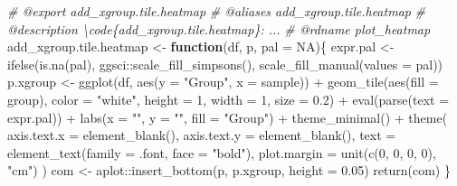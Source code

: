 \documentclass[
]{article}
\newenvironment{Shaded}{\begin{snugshade}}{\end{snugshade}}
\newcommand{\AttributeTok}[1]{\textcolor[rgb]{0.77,0.63,0.00}{#1}}
\newcommand{\CommentTok}[1]{\textcolor[rgb]{0.56,0.35,0.01}{\textit{#1}}}
\newcommand{\ConstantTok}[1]{\textcolor[rgb]{0.00,0.00,0.00}{#1}}
\newcommand{\ControlFlowTok}[1]{\textcolor[rgb]{0.13,0.29,0.53}{\textbf{#1}}}
\newcommand{\DecValTok}[1]{\textcolor[rgb]{0.00,0.00,0.81}{#1}}
\newcommand{\FloatTok}[1]{\textcolor[rgb]{0.00,0.00,0.81}{#1}}
\newcommand{\FunctionTok}[1]{\textcolor[rgb]{0.00,0.00,0.00}{#1}}
\newcommand{\NormalTok}[1]{#1}
\newcommand{\OtherTok}[1]{\textcolor[rgb]{0.56,0.35,0.01}{#1}}
\newcommand{\SpecialCharTok}[1]{\textcolor[rgb]{0.00,0.00,0.00}{#1}}
\newcommand{\StringTok}[1]{\textcolor[rgb]{0.31,0.60,0.02}{#1}}
\begin{document}
\begin{Shaded}
\begin{Highlighting}[]
\CommentTok{\#\textquotesingle{} @export add\_xgroup.tile.heatmap}
\CommentTok{\#\textquotesingle{} @aliases add\_xgroup.tile.heatmap}
\CommentTok{\#\textquotesingle{} @description \textbackslash{}code\{add\_xgroup.tile.heatmap\}: ...}
\CommentTok{\#\textquotesingle{} @rdname plot\_heatmap}
\NormalTok{add\_xgroup.tile.heatmap }\OtherTok{\textless{}{-}} 
  \ControlFlowTok{function}\NormalTok{(df, p, }\AttributeTok{pal =} \ConstantTok{NA}\NormalTok{)\{}
\NormalTok{    expr.pal }\OtherTok{\textless{}{-}} \FunctionTok{ifelse}\NormalTok{(}\FunctionTok{is.na}\NormalTok{(pal),}
      \StringTok{\textquotesingle{}ggsci::scale\_fill\_simpsons()\textquotesingle{}}\NormalTok{,}
      \StringTok{\textquotesingle{}scale\_fill\_manual(values = pal)\textquotesingle{}}\NormalTok{)}
\NormalTok{    p.xgroup }\OtherTok{\textless{}{-}} \FunctionTok{ggplot}\NormalTok{(df, }\FunctionTok{aes}\NormalTok{(}\AttributeTok{y =} \StringTok{"Group"}\NormalTok{, }\AttributeTok{x =}\NormalTok{ sample)) }\SpecialCharTok{+}
      \FunctionTok{geom\_tile}\NormalTok{(}\FunctionTok{aes}\NormalTok{(}\AttributeTok{fill =}\NormalTok{ group), }
        \AttributeTok{color =} \StringTok{"white"}\NormalTok{, }\AttributeTok{height =} \DecValTok{1}\NormalTok{, }\AttributeTok{width =} \DecValTok{1}\NormalTok{, }\AttributeTok{size =} \FloatTok{0.2}\NormalTok{) }\SpecialCharTok{+}
      \FunctionTok{eval}\NormalTok{(}\FunctionTok{parse}\NormalTok{(}\AttributeTok{text =}\NormalTok{ expr.pal)) }\SpecialCharTok{+}
      \FunctionTok{labs}\NormalTok{(}\AttributeTok{x =} \StringTok{""}\NormalTok{, }\AttributeTok{y =} \StringTok{""}\NormalTok{, }\AttributeTok{fill =} \StringTok{"Group"}\NormalTok{) }\SpecialCharTok{+}
      \FunctionTok{theme\_minimal}\NormalTok{() }\SpecialCharTok{+}
      \FunctionTok{theme}\NormalTok{(}
        \AttributeTok{axis.text.x =} \FunctionTok{element\_blank}\NormalTok{(),}
        \AttributeTok{axis.text.y =} \FunctionTok{element\_blank}\NormalTok{(),}
        \AttributeTok{text =} \FunctionTok{element\_text}\NormalTok{(}\AttributeTok{family =}\NormalTok{ .font, }\AttributeTok{face =} \StringTok{"bold"}\NormalTok{),}
        \AttributeTok{plot.margin =} \FunctionTok{unit}\NormalTok{(}\FunctionTok{c}\NormalTok{(}\DecValTok{0}\NormalTok{, }\DecValTok{0}\NormalTok{, }\DecValTok{0}\NormalTok{, }\DecValTok{0}\NormalTok{), }\StringTok{"cm"}\NormalTok{)}
\NormalTok{      )}
\NormalTok{      com }\OtherTok{\textless{}{-}}\NormalTok{ aplot}\SpecialCharTok{::}\FunctionTok{insert\_bottom}\NormalTok{(p, p.xgroup, }\AttributeTok{height =} \FloatTok{0.05}\NormalTok{)}
      \FunctionTok{return}\NormalTok{(com)}
\NormalTok{  \}}


\end{Highlighting}
\end{Shaded}
\end{document}
